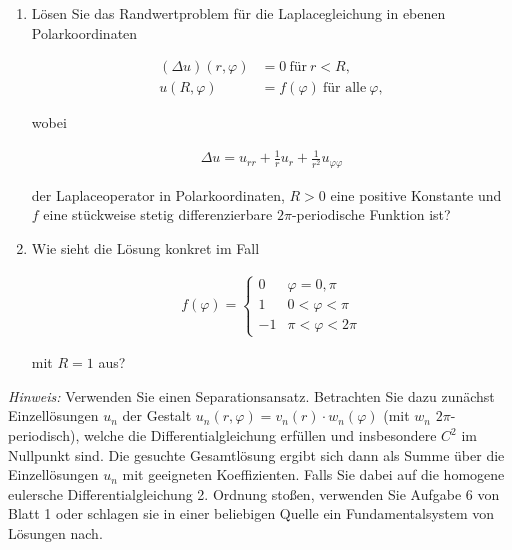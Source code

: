 
\begin{exercise}

\phantom{}

\begin{enumerate}[label = (\roman*)]

    \item Lösen Sie das Randwertproblem für die Laplacegleichung in ebenen Polarkoordinaten
    
    \begin{align*}
        (\Delta u)(r, \varphi)
        & =
        0 ~\text{für}~ r < R, \\
        u(R, \varphi)
        & =
        f(\varphi) ~\text{für alle}~ \varphi,
    \end{align*}

    wobei

    \begin{align*}
        \Delta u
        =
        u_{rr} + \frac{1}{r} u_r + \frac{1}{r^2} u_{\varphi \varphi}
    \end{align*}

    der Laplaceoperator in Polarkoordinaten, $R > 0$ eine positive Konstante und $f$ eine stückweise stetig differenzierbare $2 \pi$-periodische Funktion ist?

    \item Wie sieht die Lösung konkret im Fall
    
    \begin{align*}
        f(\varphi)
        =
        \begin{cases}
             0 & \varphi = 0, \pi \\
             1 & 0 < \varphi < \pi \\
            -1 & \pi < \varphi < 2 \pi
        \end{cases}
    \end{align*}

    mit $R = 1$ aus?

\end{enumerate}

\textit{Hinweis:}
Verwenden Sie einen Separationsansatz.
Betrachten Sie dazu zunächst Einzellösungen $u_n$ der Gestalt $u_n(r, \varphi) = v_n(r) \cdot w_n(\varphi)$ (mit $w_n$ $2 \pi$-periodisch), welche die Differentialgleichung erfüllen und insbesondere $C^2$ im Nullpunkt sind.
Die gesuchte Gesamtlösung ergibt sich dann als Summe über die Einzellösungen $u_n$ mit geeigneten Koeffizienten.
Falls Sie dabei auf die homogene eulersche Differentialgleichung 2. Ordnung stoßen, verwenden Sie Aufgabe 6 von Blatt 1 oder schlagen sie in einer beliebigen Quelle ein Fundamentalsystem von Lösungen nach.

\end{exercise}

